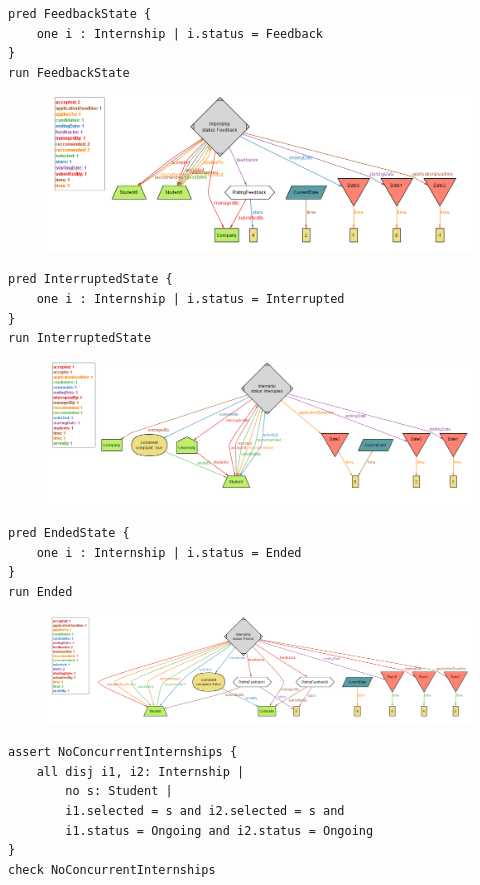 \documentclass[a4paper,12pt]{article}
\begin{document}
\begin{lstlisting}
pred FeedbackState {
    one i : Internship | i.status = Feedback
}
run FeedbackState
\end{lstlisting}
\begin{figure}[H]
    \centering
    \includegraphics[scale = 0.42]{figures/alloy/feed_State.png}
    \centering
\end{figure}
\begin{lstlisting}
pred InterruptedState {
    one i : Internship | i.status = Interrupted
}
run InterruptedState
\end{lstlisting}
\begin{figure}[H]
    \centering
    \includegraphics[scale = 0.42]{figures/alloy/interr_state.png}
    \centering
\end{figure}
\begin{lstlisting}
pred EndedState {
    one i : Internship | i.status = Ended
}
run Ended
\end{lstlisting}
\begin{figure}[H]
    \centering
    \includegraphics[width=1\textwidth]{figures/alloy/end_state.png}
    \centering
\end{figure}
\begin{lstlisting}
assert NoConcurrentInternships {
    all disj i1, i2: Internship | 
        no s: Student | 
        i1.selected = s and i2.selected = s and 
        i1.status = Ongoing and i2.status = Ongoing
}
check NoConcurrentInternships
\end{lstlisting}
\end{document}
